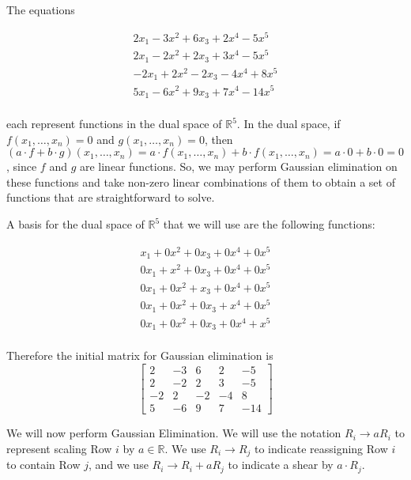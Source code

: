 \documentclass{article}
\newcommand{\R}{\mathbb{R}}
\begin{document}
\newpage
\section{}

The equations

\begin{align*}
    2x_1 - 3x^2 + 6x_3 + 2x^4 - 5x^5  \\
    2x_1 - 2x^2 + 2x_3 + 3x^4 - 5x^5  \\
    -2x_1 + 2x^2 - 2x_3 - 4x^4 + 8x^5 \\
    5x_1 - 6x^2 + 9x_3 + 7x^4 - 14x^5 \\
\end{align*}

each represent functions in the dual space of $\R^5$. In the dual space, if $f(x_1, \dots, x_n) = 0$ and $g(x_1, \dots, x_n) = 0$, then $(a\cdot f+b\cdot g)(x_1, \dots, x_n) = a \cdot f(x_1, \dots, x_n) + b \cdot f(x_1, \dots, x_n) = a \cdot 0 + b \cdot 0 = 0$, since $f$ and $g$ are linear functions. So, we may perform Gaussian elimination on these functions and take non-zero linear combinations of them to obtain a set of functions that are straightforward to solve.

A basis for the dual space of $\R^5$ that we will use are the following functions:

\begin{align*}
    x_1 + 0 x^2 + 0 x_3 + 0 x^4 + 0x^5 \\
    0x_1 + x^2 + 0 x_3 + 0 x^4 + 0x^5  \\
    0x_1 + 0x^2 +  x_3 + 0 x^4 + 0x^5  \\
    0x_1 + 0x^2 + 0 x_3 + x^4 + 0x^5   \\
    0x_1 + 0x^2 + 0 x_3 + 0x^4 + x^5   \\
\end{align*}

Therefore the initial matrix for Gaussian elimination is
\[
    \begin{bmatrix}
        2  & -3 & 6  & 2  & -5  \\
        2  & -2 & 2  & 3  & -5  \\
        -2 & 2  & -2 & -4 & 8   \\
        5  & -6 & 9  & 7  & -14
    \end{bmatrix}
\]

We will now perform Gaussian Elimination. We will use the notation $R_i \to a R_i$ to represent scaling Row $i$ by $a \in \R$. We use $R_i \to R_j$ to indicate reassigning Row $i$ to contain Row $j$, and we use $R_i \to R_i + aR_j$ to indicate a shear by $a \cdot R_j$.
\end{document}
